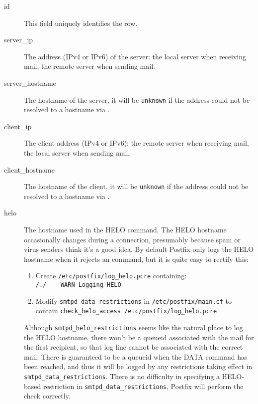 \documentclass[a4paper,12pt,draft]{article}
\newcommand{\tab}[0]{%
    \hspace*{2em}%
}
\begin{document}
\begin{description}

    \item [id] This field uniquely identifies the row.

    \item [server\_ip] The \IP{} address (IPv4 or IPv6) of the server: the
        local server when receiving mail, the remote server when sending
        mail.

    \item [server\_hostname] The hostname of the server, it will be
        \texttt{unknown} if the \IP{} address could not be resolved to a
        hostname via \DNS{}\@.

    \item [client\_ip] The client \IP{} address (IPv4 or IPv6): the remote
        server when receiving mail, the local server when sending mail.

    \item [client\_hostname] The hostname of the client, it will be
        \texttt{unknown} if the \IP{} address could not be resolved to a
        hostname via \DNS{}\@.

    \item [helo] The hostname used in the HELO command.  The HELO hostname
        occasionally changes during a connection, presumably because spam
        or virus senders think it's a good idea.  By default Postfix only
        logs the HELO hostname when it rejects an \SMTP{} command, but it
        is quite easy to rectify this:

\label{logging helo}

        \begin{enumerate}

            \item Create \texttt{/etc/postfix/log\_helo.pcre}
                containing:\newline \tab{}\texttt{/./~~~~WARN~Logging~HELO}

            \item Modify \texttt{smtpd\_data\_restrictions} in
                \texttt{/etc/postfix/main.cf} to contain\newline
                \tab{}\texttt{check\_helo\_access~/etc/postfix/log\_helo.pcre}

        \end{enumerate}

        Although \texttt{smtpd\_helo\_restrictions} seems like the natural
        place to log the HELO hostname, there won't be a queueid associated
        with the mail for the first recipient, so that log line cannot be
        associated with the correct mail.  There is guaranteed to be a
        queueid when the DATA command has been reached, and thus it will be
        logged by any restrictions taking effect in
        \texttt{smtpd\_data\_restrictions}.  There is no difficulty in
        specifying a HELO-based restriction in
        \texttt{smtpd\_data\_restrictions}, Postfix will perform the check
        correctly.


\end{description}
\end{document}
